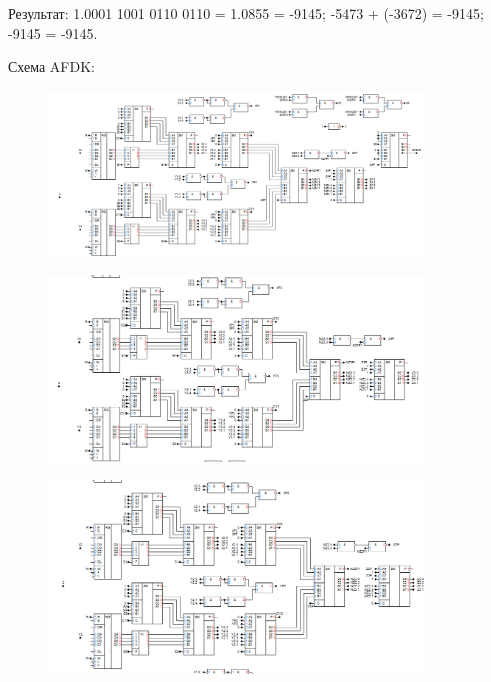 \documentclass[12pt,a4paper]{article}
\begin{document}
    Результат: 1.0001 1001 0110 0110 = 1.0855 = -9145; -5473 + (-3672) = -9145; -9145 = -9145.

    \vspace{1em}

    Схема AFDK:

    \begin{figure}[ht]
        \centering
        \includegraphics[width=0.89\textwidth]{2_1.png}
    \end{figure}

    \begin{figure}[ht]
        \centering
        \includegraphics[width=0.89\textwidth]{2_2.png}
    \end{figure}

    \newpage

    \begin{figure}[ht]
        \centering
        \includegraphics[width=0.89\textwidth]{2_3.png}
    \end{figure}
\end{document}
